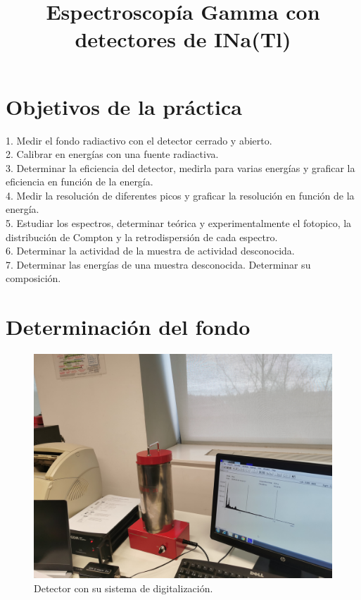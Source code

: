 \documentclass[a4paper,12pt,spanish]{article}
\begin{document}
	
	
	\title{ Espectroscopía Gamma con detectores de INa(Tl) }
	
	
	\date{}
	
	\maketitle
	
	
	\section{Objetivos de la práctica}
	
	\vspace{\baselineskip}
	
	1. Medir el fondo radiactivo con el detector cerrado y abierto.\\
	
	2. Calibrar en energías con una fuente radiactiva.\\
	
	3. Determinar la eficiencia del detector, medirla para varias energías y graficar la eficiencia en función de la energía.\\
	
	4. Medir la resolución de diferentes picos y graficar la resolución en función de la energía.\\
	
	5. Estudiar los espectros, determinar teórica y experimentalmente el fotopico, la distribución de Compton y la retrodispersión de cada espectro.\\
	
	6. Determinar la actividad de la muestra de actividad desconocida.\\
	
	7. Determinar las energías de una muestra desconocida. Determinar su composición.\\
	
	
	\section{Determinación del fondo}
	
	
\begin{figure}[H]
	\centering
	\includegraphics[width=0.7\linewidth]{../IMG_20240304_110653}
	\caption{Detector con su sistema de digitalización.}
	\label{fig:img20240304110653}
\end{figure}
\end{document}
